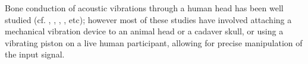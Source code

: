 \DIFdelbegin %

\DIFdelend Bone conduction of acoustic vibrations through a human head has been well studied (cf. \cite{allen:60}, \cite{hakansson:94}, \cite{stenfelt:00}, \cite{reinfeldt:10}, etc); however most of these studies have involved attaching a mechanical vibration device to an animal head or a cadaver skull, or using a vibrating piston on a live human participant, allowing for precise manipulation of the input signal.  
\DIFaddbegin {}

